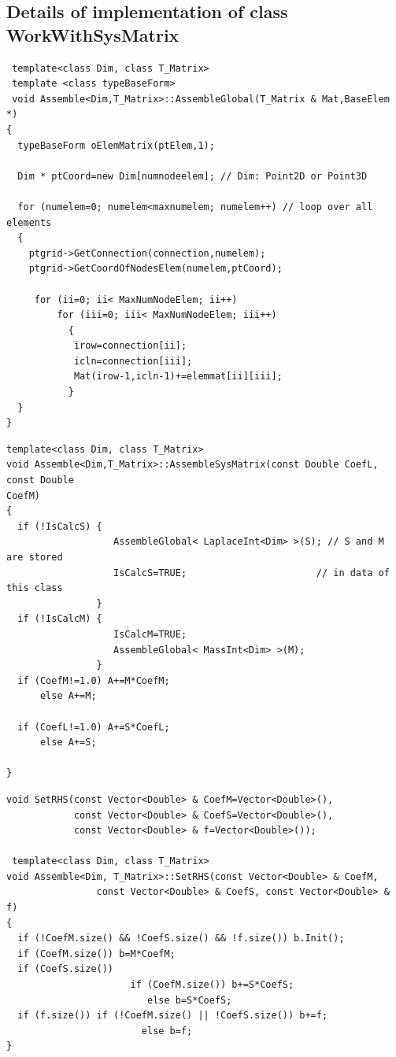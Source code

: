 \subsection{ Details of implementation of class WorkWithSysMatrix  }
\hrulefill
\begin{small}
\begin{verbatim}
 template<class Dim, class T_Matrix>  
 template <class typeBaseForm>
 void Assemble<Dim,T_Matrix>::AssembleGlobal(T_Matrix & Mat,BaseElem *) 
{
  typeBaseForm oElemMatrix(ptElem,1);  

  Dim * ptCoord=new Dim[numnodeelem]; // Dim: Point2D or Point3D  

  for (numelem=0; numelem<maxnumelem; numelem++) // loop over all elements
  {
    ptgrid->GetConnection(connection,numelem);
    ptgrid->GetCoordOfNodesElem(numelem,ptCoord); 
 
     for (ii=0; ii< MaxNumNodeElem; ii++)
         for (iii=0; iii< MaxNumNodeElem; iii++)
           {
            irow=connection[ii];
            icln=connection[iii];
            Mat(irow-1,icln-1)+=elemmat[ii][iii]; 
           }
  }
} 
\end{verbatim}
\end{small} 
\hrulefill
\newpage
\newslide
\hrulefill
\begin{small}
\begin{verbatim}
template<class Dim, class T_Matrix>
void Assemble<Dim,T_Matrix>::AssembleSysMatrix(const Double CoefL, const Double
CoefM)
{
  if (!IsCalcS) { 
                   AssembleGlobal< LaplaceInt<Dim> >(S); // S and M are stored
                   IsCalcS=TRUE;                       // in data of this class
                }
  if (!IsCalcM) {
                   IsCalcM=TRUE;
                   AssembleGlobal< MassInt<Dim> >(M);
                }
  if (CoefM!=1.0) A+=M*CoefM;
      else A+=M;
 
  if (CoefL!=1.0) A+=S*CoefL;
      else A+=S;

}
\end{verbatim}
\end{small}
\hrulefill
\newslide
\newpage
\hrulefill
\begin{small}
\begin{verbatim}
void SetRHS(const Vector<Double> & CoefM=Vector<Double>(),
            const Vector<Double> & CoefS=Vector<Double>(),
            const Vector<Double> & f=Vector<Double>());

 template<class Dim, class T_Matrix>
void Assemble<Dim, T_Matrix>::SetRHS(const Vector<Double> & CoefM,
                const Vector<Double> & CoefS, const Vector<Double> & f)
{
  if (!CoefM.size() && !CoefS.size() && !f.size()) b.Init();
  if (CoefM.size()) b=M*CoefM;
  if (CoefS.size())
                      if (CoefM.size()) b+=S*CoefS;
                         else b=S*CoefS;
  if (f.size()) if (!CoefM.size() || !CoefS.size()) b+=f;
                        else b=f;
}
\end{verbatim}
\end{small}
